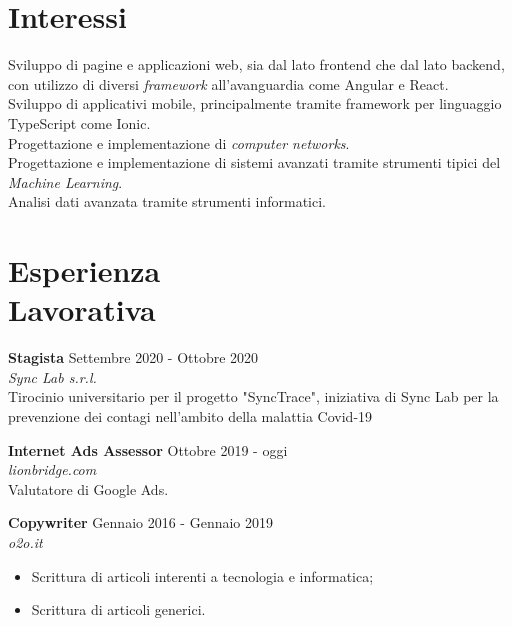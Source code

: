 \documentclass[margin, 10pt]{res}
\begin{document}
\begin{resume}
\section{Interessi}
Sviluppo di pagine e applicazioni web, sia dal lato frontend che dal lato backend, con utilizzo di diversi \textit{framework} all'avanguardia come Angular e React. \\
Sviluppo di applicativi mobile, principalmente tramite framework per linguaggio TypeScript come Ionic. \\
Progettazione e implementazione di \textit{computer networks}. \\
Progettazione e implementazione di sistemi avanzati tramite strumenti tipici del \textit{Machine Learning}. \\
Analisi dati avanzata tramite strumenti informatici.



 
\section{Esperienza \\ Lavorativa}

\textbf{Stagista} \hfill Settembre 2020 - Ottobre 2020 \\
\textit{Sync Lab s.r.l.} \\
Tirocinio universitario per il progetto "SyncTrace", iniziativa di Sync Lab per la prevenzione dei contagi nell'ambito della malattia Covid-19 


\textbf{Internet Ads Assessor} \hfill Ottobre 2019 - oggi \\
\textit{lionbridge.com} \\
Valutatore di Google Ads.

\textbf{Copywriter} \hfill Gennaio 2016 - Gennaio 2019 \\
\textit{o2o.it}
\begin{itemize}
\item Scrittura di articoli interenti a tecnologia e informatica;
\item Scrittura di articoli generici.
\end{itemize} 




\end{resume}
\end{document}
